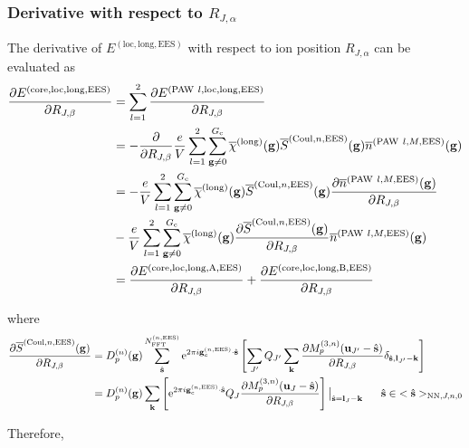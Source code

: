 \documentclass[paper=a4, fontsize=11pt]{article} %
\numberwithin{equation}{section} %
\numberwithin{figure}{section} %
\numberwithin{table}{section} %
\newcommand{\p}{\partial}
\newcommand{\ol}{\overline}
\newcommand{\bu}{{\bf{u}}}
\newcommand{\bl}{{\bf{l}}}
\newcommand{\bk}{{\bf{k}}}
\newcommand{\bs}{{\bf{s}}}
\newcommand{\bg}{{\bf{g}}}
\newcommand{\hs}{{\hat{\bf{s}}}}
\newcommand{\rEES}{{\mathrm{EES}}}
\newcommand{\rcore}{{\mathrm{core}}}
\newcommand{\rNN}{{\mathrm{NN}}}
\newcommand{\re}{{\mathrm{e}}}
\newcommand{\rCo}{{\mathrm{Coul}}}
\newcommand{\rlong}{{\mathrm{long}}}
\newcommand{\rP}{{\mathrm{PAW}}}
\newcommand{\rA}{{\mathrm{A}}}
\newcommand{\rB}{{\mathrm{B}}}
\newcommand{\rlo}{{\mathrm{loc}}}
\newcommand{\gcnEES}{{\bg_c^{(n,\rEES)}}}
\newcommand{\RJa}{{R_{J,\alpha}}}
\newcommand{\RJb}{{R_{J,\beta}}}
\newcommand{\NFFTnEES}{{N^{(n,\rEES)}_{\mathrm{FFT}}}}
\newcommand{\Gc}{{G_{\mathrm{c}}}}
\newcommand{\Dng}{{D^{(n)}_p(\bg)}}
\newcommand{\Mn}{{M_p^{(3,n)}}}
\newcommand{\hsJnzr}{{<\hs>_{\rNN,J,n,0}}}
\newcommand{\hsinJnzr}{{\ \ \ \ \ \hs  \in  \hsJnzr}}
\begin{document}
\subsubsection{Derivative with respect to $\RJa$}
The derivative of $E^{(\rlo,\rlong,\rEES)}$ with respect to ion position $\RJa$ can be evaluated as
\begin{equation}
\begin{split}
\frac{\p E^{(\rcore,\rlo,\rlong,\rEES)}}{\p \RJb}&= \sum_{l=1}^2\frac{\p E^{(\rP\ l,\rlo,\rlong,\rEES)}}{\p \RJb}\\
&=  -\frac{\p }{\p \RJb}\frac{e}{V} \sum_{l=1}^2 \sum_{\bg \neq 0}^{\Gc} \ol \chi^{(\rlong)}(\bg)  \ol S^{(\rCo,n,\rEES)}(\bg) \ol n^{(\rP\ l,M,\rEES)}(\bg)\\
&= -\frac{e}{V} \sum_{l=1}^2 \sum_{\bg \neq 0}^{\Gc} \ol \chi^{(\rlong)}(\bg) \ol S^{(\rCo,n,\rEES)}(\bg) \frac{\p \ol n^{(\rP\ l,M,\rEES)}(\bg)}{\p \RJb}\\
& -\frac{e}{V} \sum_{l=1}^2 \sum_{\bg \neq 0}^{\Gc} \ol \chi^{(\rlong)}(\bg)  \frac{\p \ol S^{(\rCo,n,\rEES)}(\bg)}{\p \RJb} \ol n^{(\rP\ l,M,\rEES)}(\bg)\\
&= \frac{\p E^{(\rcore,\rlo,\rlong,\rA,\rEES)}}{\p \RJb}+\frac{\p E^{(\rcore,\rlo,\rlong,\rB,\rEES)}}{\p \RJb}
\end{split}
\end{equation}

where
\begin{equation} 
\begin{split}
\frac{\p \ol S^{(\rCo,n,\rEES)}(\bg)}{\p \RJb}
 & = \Dng \sum_{\hat \bs}^\NFFTnEES \re^{2\pi i\gcnEES \cdot \hat\bs} \left[\sum_{J'} Q_{J'} \sum_{\bk} \frac{\p \Mn (\bu_{J'}-\hat \bs)}{\p \RJb}\delta_{\hat \bs,\bl_{J'}-\bk}\right] \\
 & = \Dng \sum_{\bk}\left[\re^{2\pi i\gcnEES \cdot \hat\bs} Q_{J}  \frac{\p \Mn (\bu_{J}-\hat \bs)}{\p \RJb}\right] \big|_{\hs=\bl_{J}-\bk} \hsinJnzr\\
\end{split}
\end{equation}

Therefore,
\end{document}
